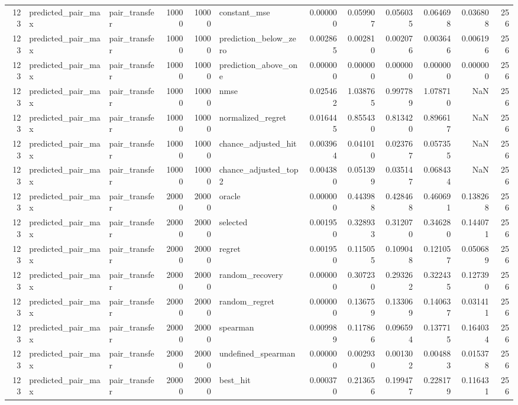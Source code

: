 \begin{tabular}{rllrrlrrrrrr}
123 & predicted_pair_max & pair_transfer & 10000 & 10000 & constant_mse & 0.000000 & 0.059907 & 0.056035 & 0.064698 & 0.036808 & 256 \\
123 & predicted_pair_max & pair_transfer & 10000 & 10000 & prediction_below_zero & 0.002865 & 0.002810 & 0.002076 & 0.003646 & 0.006196 & 256 \\
123 & predicted_pair_max & pair_transfer & 10000 & 10000 & prediction_above_one & 0.000000 & 0.000000 & 0.000000 & 0.000000 & 0.000000 & 256 \\
123 & predicted_pair_max & pair_transfer & 10000 & 10000 & nmse & 0.025462 & 1.038765 & 0.997789 & 1.078710 & NaN & 256 \\
123 & predicted_pair_max & pair_transfer & 10000 & 10000 & normalized_regret & 0.016445 & 0.855430 & 0.813420 & 0.896617 & NaN & 256 \\
123 & predicted_pair_max & pair_transfer & 10000 & 10000 & chance_adjusted_hit & 0.003964 & 0.041010 & 0.023767 & 0.057355 & NaN & 256 \\
123 & predicted_pair_max & pair_transfer & 10000 & 10000 & chance_adjusted_top2 & 0.004380 & 0.051399 & 0.035147 & 0.068434 & NaN & 256 \\
123 & predicted_pair_max & pair_transfer & 20000 & 20000 & oracle & 0.000000 & 0.443988 & 0.428468 & 0.460691 & 0.138268 & 256 \\
123 & predicted_pair_max & pair_transfer & 20000 & 20000 & selected & 0.001950 & 0.328933 & 0.312070 & 0.346280 & 0.144071 & 256 \\
123 & predicted_pair_max & pair_transfer & 20000 & 20000 & regret & 0.001950 & 0.115055 & 0.109048 & 0.121057 & 0.050689 & 256 \\
123 & predicted_pair_max & pair_transfer & 20000 & 20000 & random_recovery & 0.000000 & 0.307230 & 0.293262 & 0.322435 & 0.127390 & 256 \\
123 & predicted_pair_max & pair_transfer & 20000 & 20000 & random_regret & 0.000000 & 0.136759 & 0.133069 & 0.140637 & 0.031411 & 256 \\
123 & predicted_pair_max & pair_transfer & 20000 & 20000 & spearman & 0.009989 & 0.117866 & 0.096594 & 0.137715 & 0.164034 & 256 \\
123 & predicted_pair_max & pair_transfer & 20000 & 20000 & undefined_spearman & 0.000000 & 0.002930 & 0.001302 & 0.004883 & 0.015378 & 256 \\
123 & predicted_pair_max & pair_transfer & 20000 & 20000 & best_hit & 0.000370 & 0.213656 & 0.199477 & 0.228179 & 0.116431 & 256 \\

\end{tabular}
